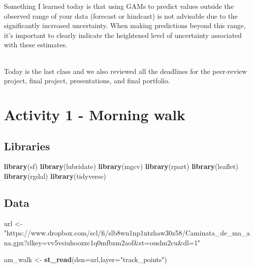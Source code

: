 \documentclass[
]{book}
\newenvironment{Shaded}{\begin{snugshade}}{\end{snugshade}}
\newcommand{\AttributeTok}[1]{\textcolor[rgb]{0.13,0.29,0.53}{#1}}
\newcommand{\FunctionTok}[1]{\textcolor[rgb]{0.13,0.29,0.53}{\textbf{#1}}}
\newcommand{\NormalTok}[1]{#1}
\newcommand{\OtherTok}[1]{\textcolor[rgb]{0.56,0.35,0.01}{#1}}
\newcommand{\StringTok}[1]{\textcolor[rgb]{0.31,0.60,0.02}{#1}}
\begin{document}
Something I learned today is that using GAMs to predict values outside the observed range of your data (forecast or hindcast) is not advisable due to the significantly increased uncertainty. When making predictions beyond this range, it's important to clearly indicate the heightened level of uncertainty associated with these estimates.\\
\strut \\
Today is the last class and we also reviewed all the deadlines for the peer-review project, final project, presentations, and final portfolio.

\hypertarget{activity-1---morning-walk}{%
\chapter{Activity 1 - Morning walk}\label{activity-1---morning-walk}}

\hypertarget{libraries}{%
\section{Libraries}\label{libraries}}

\begin{Shaded}
\begin{Highlighting}[]
\FunctionTok{library}\NormalTok{(sf)}
\FunctionTok{library}\NormalTok{(lubridate)}
\FunctionTok{library}\NormalTok{(mgcv)}
\FunctionTok{library}\NormalTok{(rpart)}
\FunctionTok{library}\NormalTok{(leaflet)}
\FunctionTok{library}\NormalTok{(rgdal)}
\FunctionTok{library}\NormalTok{(tidyverse)}
\end{Highlighting}
\end{Shaded}

\hypertarget{data}{%
\section{Data}\label{data}}

\begin{Shaded}
\begin{Highlighting}[]
\NormalTok{url }\OtherTok{\textless{}{-}} \StringTok{"https://www.dropbox.com/scl/fi/slb8wn1np1ntzhaw30z58/Caminata\_de\_ma\_ana.gpx?rlkey=vv5vsiuhoozzc1q0mfbzm2aof\&st=ouslm2cu\&dl=1"}

\NormalTok{am\_walk }\OtherTok{\textless{}{-}} \FunctionTok{st\_read}\NormalTok{(}\AttributeTok{dsn=}\NormalTok{url,}\AttributeTok{layer=}\StringTok{"track\_points"}\NormalTok{) }
\end{Highlighting}
\end{Shaded}
\end{document}
